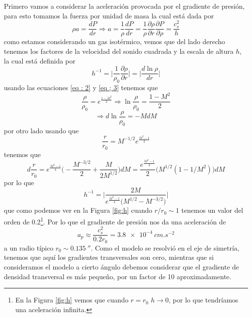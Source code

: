 \documentclass{book}
\begin{document}
Primero vamos a considerar la aceleración provocada por el gradiente de presión, para esto tomamos la fuerza por unidad de masa la cual está dada por 
\begin{equation}
\rho a = \frac{dP}{dr}\Rightarrow a= \frac{1}{\rho}\frac{dP}{dr}=\frac{1}{\rho}\frac{\partial \rho}{\partial r}\frac{\partial P}{\partial\rho}=\frac{c_s^2}{h}
\end{equation}
como estamos considerando un gas isotérmico, vemos que del lado derecho tenemos los factores de la velocidad del sonido cuadrada y la escala de altura $h$, la cual está definida por 
\begin{equation}
h^{-1}=\Big|\frac{1}{\rho_0}\frac{\partial\rho}{\partial r}\Big|=\Big|\frac{d \ln \rho}{dr}\Big|
\end{equation}
usando las ecuaciones \ref{eq : 2} y \ref{eq ; 3} tenemos que 
\begin{equation}
\frac{\rho}{\rho_0}=e^{\frac{1-M^2}{2}}\Rightarrow\ln\frac{\rho}{\rho_0}=\frac{1-M^2}{2}
\end{equation}
\begin{equation}
\Rightarrow d\ln\frac{\rho}{\rho_0}=-M dM
\end{equation}
por otro lado usando que 
\begin{equation}
\frac{r}{r_0}=M^{-1/2}e^{\frac{M^2-1}{2}}
\end{equation}
tenemos que 
\begin{equation}
d\frac{r}{r_0}=e^{\frac{M^2-1}{4}}\Big(-\frac{M^{-3/2}}{2}+\frac{M}{2M^{1/2}}\Big)dM = \frac{e^{\frac{M^2-1}{4}}}{2}\Big(M^{1/2}(1-1/M^2) \Big)dM
\end{equation}
por lo que 
\begin{equation}
h^{-1}=\Big|\frac{2M}{e^{\frac{M^2-1}{4}}\Big(M^{1/2}-M^{-3/2}\Big)}\Big|
\end{equation}
que como podemos ver en la Figura \ref{fig:h} cuando $r/r_0\sim 1$ tenemos un valor del orden de 0.2\footnote{En la Figura \ref{fig:h} vemos que cuando $r=r_0$ $h\to 0$, por lo que tendríamos una aceleración infinita.}. Por lo que el gradiente de presión nos da una aceleración de 
\begin{equation}
a_p \approx \frac{c_s^2}{0.2 r_0} = \SI{3.8e-4}{cm.s^{-2}}
\end{equation}
a un radio típico $r_0\sim \SI{0.135}{\arcsecond}$. Como el modelo se resolvió en el eje de simetría, tenemos que aquí los gradientes transversales son cero, mientras que si consideramos el modelo a cierto ángulo debemos considerar que el gradiente de densidad transversal es más pequeño, por un factor de 10 aproximadamente. 
\end{document}
